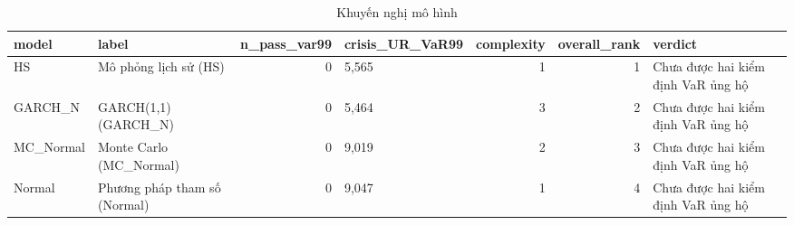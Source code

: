 \begin{table}
\caption{Khuyến nghị mô hình}
\label{tab:T15_model_recommendation}
\begin{tabular}{llrlrrl}
\toprule
model & label & n\_pass\_var99 & crisis\_UR\_VaR99 & complexity & overall\_rank & verdict \\
\midrule
HS & Mô phỏng lịch sử (HS) & 0 & 5,565 & 1 & 1 & Chưa được hai kiểm định VaR ủng hộ \\
GARCH\_N & GARCH(1,1) (GARCH\_N) & 0 & 5,464 & 3 & 2 & Chưa được hai kiểm định VaR ủng hộ \\
MC\_Normal & Monte Carlo (MC\_Normal) & 0 & 9,019 & 2 & 3 & Chưa được hai kiểm định VaR ủng hộ \\
Normal & Phương pháp tham số (Normal) & 0 & 9,047 & 1 & 4 & Chưa được hai kiểm định VaR ủng hộ \\
\bottomrule
\end{tabular}
\end{table}
